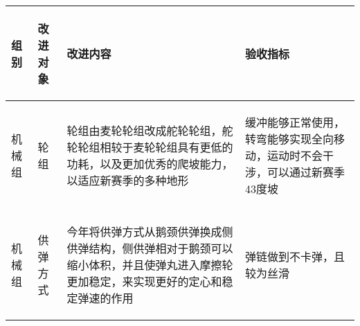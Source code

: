 
\begin{longtable}{ p{1.5cm} | p{3cm} | p{6cm} | p{4.3cm} |}

    \hline

    \endfoot
    
    \rowcolor{tabhdcolor}

        \begin{center}
            组别
        \end{center} &
        \begin{center}
            改进对象
        \end{center} &
        \begin{center}
            改进内容
        \end{center} &
        \begin{center}
            验收指标
        \end{center}\\

    \hline

    \endhead

        \begin{center}
            机械组
        \end{center} &
        \begin{center}
            轮组
        \end{center} &
        \begin{center}
            轮组由麦轮轮组改成舵轮轮组，舵轮轮组相较于麦轮轮组具有更低的功耗，以及更加优秀的爬坡能力，以适应新赛季的多种地形
        \end{center} &
        \begin{center}
            缓冲能够正常使用，转弯能够实现全向移动，运动时不会干涉，可以通过新赛季43度坡
        \end{center}\\
        
    \hline
        \begin{center}
            机械组
        \end{center}&
        \begin{center}
            供弹方式
        \end{center}&
        \begin{center}
            今年将供弹方式从鹅颈供弹换成侧供弹结构，侧供弹相对于鹅颈可以缩小体积，并且使弹丸进入摩擦轮更加稳定，来实现更好的定心和稳定弹速的作用
        \end{center}&
        \begin{center}
            弹链做到不卡弹，且较为丝滑
        \end{center}\\
        

\end{longtable}
